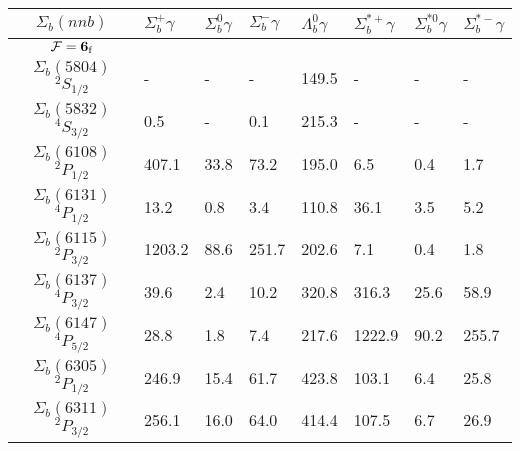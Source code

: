 \begin{tabular}{c |  p{0.65cm}  p{0.65cm}  p{0.65cm}  p{0.65cm}  p{0.65cm}  p{0.65cm}  p{0.65cm}} \hline \hline
$\Sigma_b(nnb)$  & $\Sigma_{b}^{+} \gamma$  & $\Sigma_{b}^{0} \gamma$  & $\Sigma_{b}^{-} \gamma$  & $\Lambda_{b}^{0} \gamma$  & $\Sigma_{b}^{*+} \gamma$  & $\Sigma_{b}^{*0} \gamma$  & $\Sigma_{b}^{*-} \gamma$  \\ \hline
$\mathcal{F}={\bf {6}}_{\rm f}$ &&&&&&&\\ \hline
$\Sigma_b(5804)$ $^{2}S_{1/2}$&-  &-  &-  &149.5  &-  &-  &- \\
$\Sigma_b(5832)$ $^{4}S_{3/2}$&0.5  &-  &0.1  &215.3  &-  &-  &- \\
$\Sigma_b(6108)$ $^{2}P_{1/2}$&407.1  &33.8  &73.2  &195.0  &6.5  &0.4  &1.7 \\
$\Sigma_b(6131)$ $^{4}P_{1/2}$&13.2  &0.8  &3.4  &110.8  &36.1  &3.5  &5.2 \\
$\Sigma_b(6115)$ $^{2}P_{3/2}$&1203.2  &88.6  &251.7  &202.6  &7.1  &0.4  &1.8 \\
$\Sigma_b(6137)$ $^{4}P_{3/2}$&39.6  &2.4  &10.2  &320.8  &316.3  &25.6  &58.9 \\
$\Sigma_b(6147)$ $^{4}P_{5/2}$&28.8  &1.8  &7.4  &217.6  &1222.9  &90.2  &255.7 \\
$\Sigma_b(6305)$ $^{2}P_{1/2}$&246.9  &15.4  &61.7  &423.8  &103.1  &6.4  &25.8 \\
$\Sigma_b(6311)$ $^{2}P_{3/2}$&256.1  &16.0  &64.0  &414.4  &107.5  &6.7  &26.9 \\
\hline \hline
\end{tabular}
